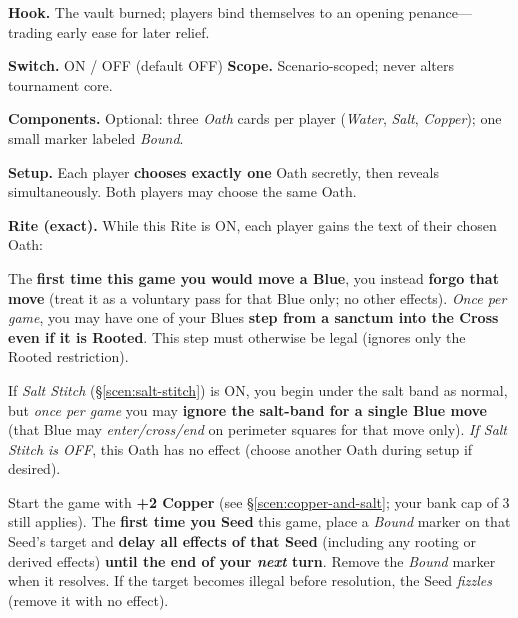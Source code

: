 \documentclass[11pt]{article}
\numberwithin{equation}{section} %
\theoremstyle{plain} %
\theoremstyle{definition} %
\theoremstyle{remark} %
\begin{document}
\noindent\textbf{Hook.} The vault burned; players bind themselves to an opening penance—trading early ease for later relief.

\medskip
\noindent\textbf{Switch.} \textsc{ON / OFF} (default \textsc{OFF}) \hfill \textbf{Scope.} Scenario-scoped; never alters tournament core.

\medskip
\noindent\textbf{Components.} Optional: three \emph{Oath} cards per player (\textit{Water}, \textit{Salt}, \textit{Copper}); one small marker labeled \emph{Bound}.

\medskip
\noindent\textbf{Setup.} Each player \textbf{chooses exactly one} Oath secretly, then reveals simultaneously. Both players may choose the same Oath.

\medskip
\noindent\textbf{Rite (exact).} While this Rite is \textsc{ON}, each player gains the text of their chosen Oath:

\begin{description}\setlength\itemsep{0.35em}
  \item[\textit{Oath of Water.}] The \textbf{first time this game you would move a Blue}, you instead \textbf{forgo that move} (treat it as a voluntary pass for that Blue only; no other effects). \emph{Once per game}, you may have one of your Blues \textbf{step from a sanctum into the Cross even if it is Rooted}. This step must otherwise be legal (ignores only the Rooted restriction).

  \item[\textit{Oath of Salt.}] If \emph{Salt Stitch} (\S\ref{scen:salt-stitch}) is \textsc{ON}, you begin under the salt band as normal, but \emph{once per game} you may \textbf{ignore the salt-band for a single Blue move} (that Blue may \emph{enter/cross/end} on perimeter squares for that move only). \emph{If Salt Stitch is \textsc{OFF}}, this Oath has no effect (choose another Oath during setup if desired).

  \item[\textit{Oath of Copper.}] Start the game with \textbf{+2 Copper} (see \S\ref{scen:copper-and-salt}; your bank cap of 3 still applies). The \textbf{first time you Seed} this game, place a \emph{Bound} marker on that Seed’s target and \textbf{delay all effects of that Seed} (including any rooting or derived effects) \textbf{until the end of your \emph{next} turn}. Remove the \emph{Bound} marker when it resolves. If the target becomes illegal before resolution, the Seed \emph{fizzles} (remove it with no effect).
\end{description}
\end{document}
